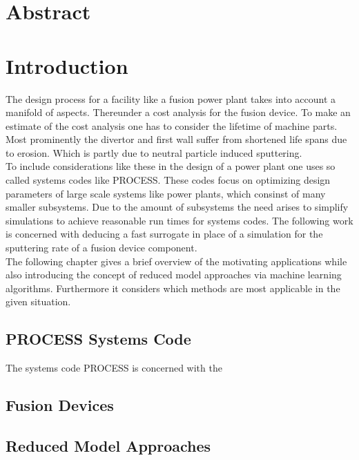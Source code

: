\chapter*{Abstract}

\chapter{Introduction}
	The design process for a facility like a fusion power plant takes into account a manifold of aspects. Thereunder a cost analysis for the fusion device. To make an estimate of the cost analysis one has to consider the lifetime of machine parts. Most prominently the divertor and first wall suffer from shortened life spans due to erosion. Which is partly due to neutral particle induced sputtering.\\
	To include considerations like these in the design of a power plant one uses so called systems codes like PROCESS\cite{process}. These codes focus on optimizing design parameters of large scale systems like power plants, which consinst of many smaller subsystems. Due to the amount of subsystems the need arises to simplify simulations to achieve reasonable run times for systems codes. The following work is concerned with deducing a fast surrogate in place of a simulation for the sputtering rate of a fusion device component.\\
	The following chapter gives a brief overview of the motivating applications while also introducing the concept of reduced model approaches via machine learning algorithms. Furthermore it considers which methods are most applicable in the given situation.\\
	
	\section{PROCESS Systems Code}
	The systems code PROCESS\cite{process} is concerned with the 
	
	
	\section{Fusion Devices}
	
	
	\section{Reduced Model Approaches}
